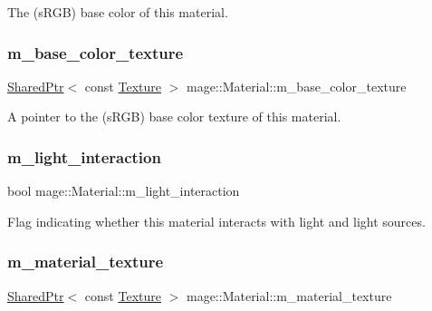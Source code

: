 The (s\+R\+GB) base color of this material. \hypertarget{structmage_1_1_material_ae3d40b79a275a212ea7068b0c3f8840c}{}\label{structmage_1_1_material_ae3d40b79a275a212ea7068b0c3f8840c} 
\subsubsection{\texorpdfstring{m\+\_\+base\+\_\+color\+\_\+texture}{m\_base\_color\_texture}}
{\footnotesize\ttfamily \hyperlink{namespacemage_a1e01ae66713838a7a67d30e44c67703e}{Shared\+Ptr}$<$ const \hyperlink{classmage_1_1_texture}{Texture} $>$ mage\+::\+Material\+::m\+\_\+base\+\_\+color\+\_\+texture\hspace{0.3cm}{\ttfamily [private]}}

A pointer to the (s\+R\+GB) base color texture of this material. \hypertarget{structmage_1_1_material_a636ddbd882e3ff2841c192c5ecbc5053}{}\label{structmage_1_1_material_a636ddbd882e3ff2841c192c5ecbc5053} 
\subsubsection{\texorpdfstring{m\+\_\+light\+\_\+interaction}{m\_light\_interaction}}
{\footnotesize\ttfamily bool mage\+::\+Material\+::m\+\_\+light\+\_\+interaction\hspace{0.3cm}{\ttfamily [private]}}

Flag indicating whether this material interacts with light and light sources. \hypertarget{structmage_1_1_material_aedd606b3cc103ba756aaca9433da0794}{}\label{structmage_1_1_material_aedd606b3cc103ba756aaca9433da0794} 
\subsubsection{\texorpdfstring{m\+\_\+material\+\_\+texture}{m\_material\_texture}}
{\footnotesize\ttfamily \hyperlink{namespacemage_a1e01ae66713838a7a67d30e44c67703e}{Shared\+Ptr}$<$ const \hyperlink{classmage_1_1_texture}{Texture} $>$ mage\+::\+Material\+::m\+\_\+material\+\_\+texture\hspace{0.3cm}{\ttfamily [private]}}

